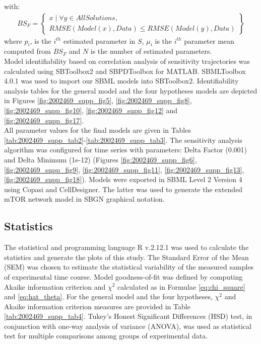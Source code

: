 with:
\begin{align*}
BS_F = 
 \begin{Bmatrix}
    x\; |\; \forall y \in AllSolutions,  \\
    RMSE(Model(x), Data) \leq RMSE(Model(y), Data) 
 \end{Bmatrix}
\end{align*}
where $p_i$, is the $i^{th}$ estimated parameter in $S$, $\mu_i$ is the $i^{th}$ parameter mean computed from $BS_F$ and $N$ is the number of estimated parameters. \\
Model identifiability based on correlation analysis of sensitivity trajectories was calculated using SBToolbox2 and SBPDToolbox \citep{Schmidt2006} for MATLAB. SBMLToolbox 4.0.1 \citep{keating2006} was used to import our SBML \citep{hucka2003systems} models into SBToolbox2. Identifiability analysis tables for the general model and the four hypotheses models are depicted in Figures \ref{fig:2002469_supp_fig5}, \ref{fig:2002469_supp_fig8}, \ref{fig:2002469_supp_fig10}, \ref{fig:2002469_supp_fig12} and \ref{fig:2002469_supp_fig17}.\\
All parameter values for the final models are given in Tables \ref{tab:2002469_supp_tab2}-\ref{tab:2002469_supp_tab3}. The sensitivity analysis algorithm was configured for time series with parameters: Delta Factor (0.001) and Delta Minimum (1e-12) (Figures \ref{fig:2002469_supp_fig6}, \ref{fig:2002469_supp_fig9}, \ref{fig:2002469_supp_fig11}, \ref{fig:2002469_supp_fig13}, \ref{fig:2002469_supp_fig18}). Models were exported in SBML Level 2 Version 4 using Copasi and CellDesigner. The latter was used to generate the extended mTOR network model in SBGN graphical notation.

\subsection{Statistics}
\label{paper1-subsec:Statistics}
The statistical and programming language R v.2.12.1 \citep{RCoreTeam} was used to calculate the statistics and generate the plots of this study. The Standard Error of the Mean (SEM) was chosen to estimate the statistical variability of the measured samples of experimental time course. Model goodness-of-fit was defined by computing Akaike information criterion \citep{Akaike1973} and $\chi^2$ calculated as in Formulae \ref{eq:chi_square} and \ref{eq:hat_theta}. For the general model and the four hypotheses, $\chi^2$ and Akaike information criterion measures are provided in Table \ref{tab:2002469_supp_tab4}. Tukey's Honest Significant Differences (HSD) test, in conjunction with one-way analysis of variance (ANOVA), was used as statistical test for multiple comparisons among groups of experimental data.


